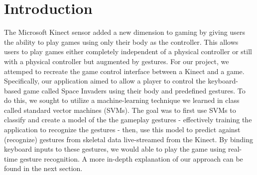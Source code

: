 \documentclass[11pt,conference]{IEEEtran}
\begin{document}
\section{Introduction}
 The Microsoft Kinect sensor added a new dimension to gaming by giving users the ability to play games using only their body as the controller. This allows users to play games either completely independent of a physical controller or still with a physical controller but augmented by gestures. For our project, we attemped to recreate the game control interface between a Kinect and a game. Specifically, our application aimed to allow a player to control the keyboard-based game called Space Invaders using their body and predefined gestures. To do this, we sought to utilize a machine-learning technique we learned in class called standard vector machines (SVMs). The goal was to first use SVMs to classify and create a model of the the gameplay gestures - effectively training the application to recognize the gestures - then, use this model to predict against (recognize) gestures from skeletal data live-streamed from the Kinect. By binding keyboard inputs to these gestures, we would able to play the game using real-time gesture recognition. A more in-depth explanation of our approach can be found in the next section. 
\end{document}
